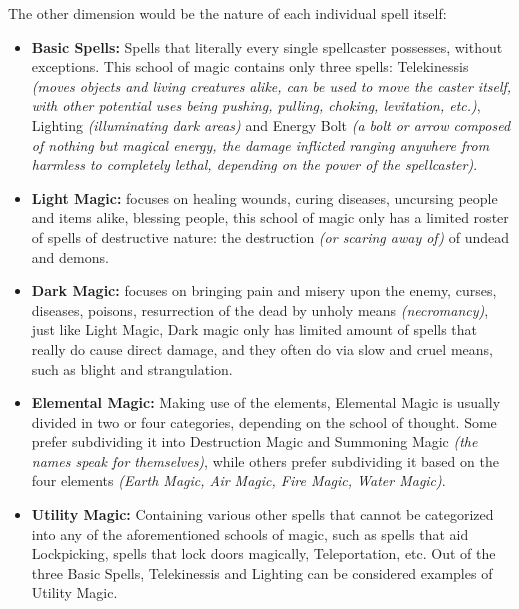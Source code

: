 The other dimension would be the nature of each individual spell itself:
\begin{itemize}
\item \textbf{Basic Spells:} Spells that literally every single spellcaster possesses, without exceptions. This school of magic contains only three spells: Telekinessis \textit{(moves objects and living creatures alike, can be used to move the caster itself, with other potential uses being pushing, pulling, choking, levitation, etc.)}, Lighting \textit{(illuminating dark areas)} and Energy Bolt \textit{(a bolt or arrow composed of nothing but magical energy, the damage inflicted ranging anywhere from harmless to completely lethal, depending on the power of the spellcaster)}.
\item \textbf{Light Magic:} focuses on healing wounds, curing diseases, uncursing people and items alike, blessing people, this school of magic only has a limited roster of spells of destructive nature: the destruction \textit{(or scaring away of)} of undead and demons.
\item \textbf{Dark Magic:} focuses on bringing pain and misery upon the enemy, curses, diseases, poisons, resurrection of the dead by unholy means \textit{(necromancy)}, just like Light Magic, Dark magic only has limited amount of spells that really do cause direct damage, and they often do via slow and cruel means, such as blight and strangulation.
\item \textbf{Elemental Magic:} Making use of the elements, Elemental Magic is usually divided in two or four categories, depending on the school of thought. Some prefer subdividing it into Destruction Magic and Summoning Magic \textit{(the names speak for themselves)}, while others prefer subdividing it based on the four elements \textit{(Earth Magic, Air Magic, Fire Magic, Water Magic)}.
\item \textbf{Utility Magic:} Containing various other spells that cannot be categorized into any of the aforementioned schools of magic, such as spells that aid Lockpicking, spells that lock doors magically, Teleportation, etc. Out of the three Basic Spells, Telekinessis and Lighting can be considered examples of Utility Magic.
\end{itemize}
